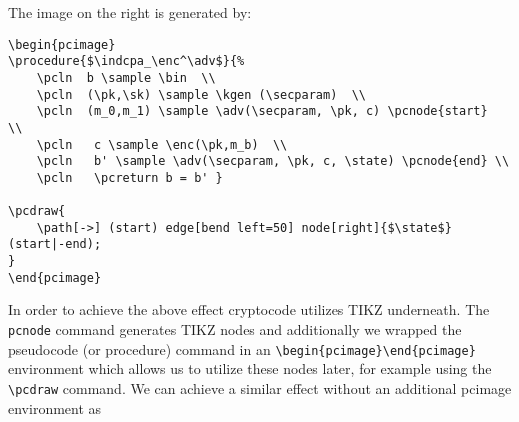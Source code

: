 \documentclass[a4paper]{report}
\begin{document}
\begin{center}

\end{center}

The image on the right is generated by:
\begin{lstlisting}
\begin{pcimage}
\procedure{$\indcpa_\enc^\adv$}{%
	\pcln  b \sample \bin  \\
	\pcln  (\pk,\sk) \sample \kgen (\secparam)  \\
	\pcln  (m_0,m_1) \sample \adv(\secparam, \pk, c) \pcnode{start}  \\
	\pcln   c \sample \enc(\pk,m_b)  \\
	\pcln   b' \sample \adv(\secparam, \pk, c, \state) \pcnode{end} \\
	\pcln   \pcreturn b = b' }

\pcdraw{
	\path[->] (start) edge[bend left=50] node[right]{$\state$} (start|-end);
}
\end{pcimage}
\end{lstlisting}

In order to achieve the above effect cryptocode utilizes TIKZ underneath. The
\lstinline$pcnode$ command generates TIKZ nodes and additionally we wrapped the
pseudocode (or procedure) command in an \lstinline$\begin{pcimage}\end{pcimage}$ environment
which allows us to utilize these nodes later, for example using the  \lstinline$\pcdraw$
command. We can achieve a similar effect without an additional pcimage environment as
\end{document}

